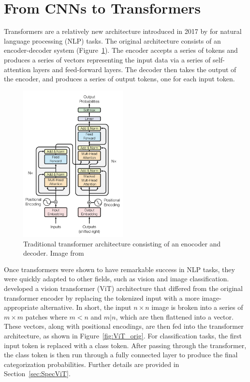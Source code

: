 \section{From CNNs to Transformers}\label{sec:transformers}
Transformers are a relatively new architecture introduced in 2017 by \textcite{vaswani2017}
for natural language processing (NLP) tasks. The original architecture consists of 
an encoder-decoder system (Figure~\ref{fig:transformer_orig}). The encoder accepts a series of tokens and produces a series of vectors
representing the input data via a series 
of self-attention layers and feed-forward layers. The decoder then takes the output of the encoder, and
produces a series of output tokens, one for each input token. 

\begin{figure}[ht]
    \centering
    \includegraphics[height=8cm]{figures/transformer_paper/Transformer_Original.png}
    \caption[Transformer Architecture]{Traditional transformer architecture consisting of an enocoder and decoder. 
        Image from \textcite{vaswani2017}
    \label{fig:transformer_orig}}
\end{figure}

Once transformers were shown to have remarkable success in NLP tasks, they were 
quickly adapted to other fields, such as vision and image classification.
\textcite{dosovitskiy2020} developed a vision transformer (ViT) architecture 
that differed from the original transformer encoder by replacing the tokenized 
input with a more image-appropriate alternative. In short, 
the input $n\times n$ image is broken into a series of $m\times m$ patches where 
$m<n$ and $m|n$, which are then flattened into
a vector. These vectors, along with positional encodings, are then fed into the
transformer architecture, as shown in Figure~\ref{fig:ViT_orig}. For classification tasks, the first input token is 
replaced with a class token. After passing through the transformer, the class token 
is then run through a fully connected layer to produce the final categorization probabilities. 
Further details are provided in Section~\ref{sec:SpecViT}. 

